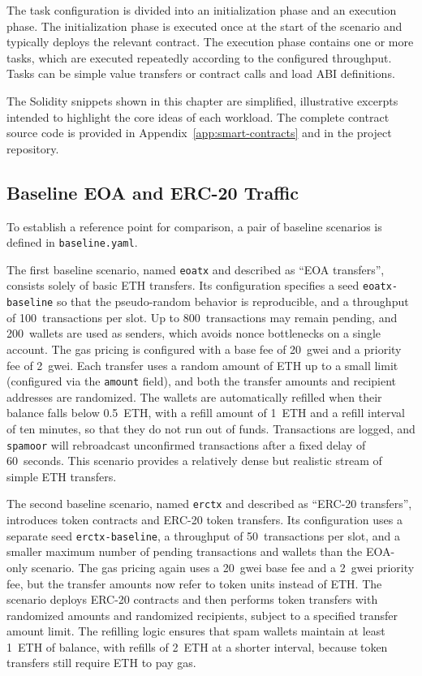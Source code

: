 The task configuration is divided into an initialization phase and an execution phase. The initialization phase is executed once at the start of the scenario and typically deploys the relevant contract. The execution phase contains one or more tasks, which are executed repeatedly according to the configured throughput. Tasks can be simple value transfers or contract calls and load ABI definitions.

The Solidity snippets shown in this chapter are simplified, illustrative excerpts intended to highlight the core ideas of each workload. The complete contract source code is provided in Appendix~\ref{app:smart-contracts} and in the project repository.

\subsection{Baseline EOA and ERC-20 Traffic}
To establish a reference point for comparison, a pair of baseline scenarios is defined in \texttt{baseline.yaml}.

The first baseline scenario, named \texttt{eoatx} and described as ``EOA transfers'', consists solely of basic ETH transfers. Its configuration specifies a seed \texttt{eoatx-baseline} so that the pseudo-random behavior is reproducible, and a throughput of 100~transactions per slot. Up to 800~transactions may remain pending, and 200~wallets are used as senders, which avoids nonce bottlenecks on a single account. The gas pricing is configured with a base fee of 20~gwei and a priority fee of 2~gwei. Each transfer uses a random amount of ETH up to a small limit (configured via the \texttt{amount} field), and both the transfer amounts and recipient addresses are randomized. The wallets are automatically refilled when their balance falls below 0.5~ETH, with a refill amount of 1~ETH and a refill interval of ten minutes, so that they do not run out of funds. Transactions are logged, and \texttt{spamoor} will rebroadcast unconfirmed transactions after a fixed delay of 60~seconds. This scenario provides a relatively dense but realistic stream of simple ETH transfers.

The second baseline scenario, named \texttt{erctx} and described as ``ERC-20 transfers'', introduces token contracts and ERC-20 token transfers. Its configuration uses a separate seed \texttt{erctx-baseline}, a throughput of 50~transactions per slot, and a smaller maximum number of pending transactions and wallets than the EOA-only scenario. The gas pricing again uses a 20~gwei base fee and a 2~gwei priority fee, but the transfer amounts now refer to token units instead of ETH. The scenario deploys ERC-20 contracts and then performs token transfers with randomized amounts and randomized recipients, subject to a specified transfer amount limit. The refilling logic ensures that spam wallets maintain at least 1~ETH of balance, with refills of 2~ETH at a shorter interval, because token transfers still require ETH to pay gas.


